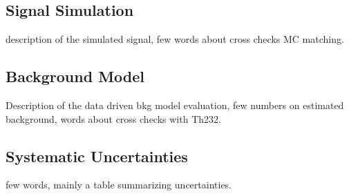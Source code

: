 \subsection{Signal Simulation} 

description of the simulated signal, few words about cross checks MC matching.


\subsection {Background Model}
Description of the data driven bkg model evaluation, few numbers on estimated background, words about cross checks with Th232.

\subsection{Systematic Uncertainties}

few words, mainly a table summarizing uncertainties.

